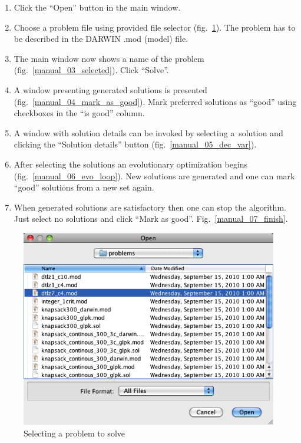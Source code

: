 \begin{enumerate}
\item Click the ``Open'' button in the main window.
\item Choose a problem file using provided file selector
  (fig.~\ref{manual_02_problem_selector}). The problem has to be described in
  the DARWIN .mod (model) file.
\item The main window now shows a name of the problem
  (fig.~\ref{manual_03_selected}). Click ``Solve''.
\item A window presenting generated solutions is presented
  (fig.~\ref{manual_04_mark_as_good}). Mark preferred solutions as ``good''
  using checkboxes in the ``is good'' column.
\item A window with solution details can be invoked by selecting a~solution
  and clicking the ``Solution details'' button (fig.~\ref{manual_05_dec_var}).
\item After selecting the solutions an evolutionary optimization begins
  (fig.~\ref{manual_06_evo_loop}). New solutions are generated and one can
  mark ``good'' solutions from a new set again.
\item When generated solutions are satisfactory then one can stop the
  algorithm. Just select no solutions and click ``Mark as
  good''. Fig.~\ref{manual_07_finish}.
\end{enumerate}

\begin{figure}
  \centering
  \includegraphics[scale=0.7]{img/manual/02_problem_selector}
  \caption{Selecting a problem to solve}
  \label{manual_02_problem_selector}
\end{figure}

